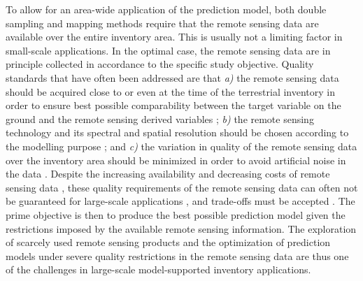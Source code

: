 To allow for an area-wide application of the prediction model, both double sampling and mapping methods require that the remote sensing data are available over the entire inventory area. This is usually not a limiting factor in small-scale applications. In the optimal case, the remote sensing data are in principle collected in accordance to the specific study objective. Quality standards that have often been addressed are that \textit{a)} the remote sensing data should be acquired close to or even at the time of the terrestrial inventory in order to ensure best possible comparability between the target variable on the ground and the remote sensing derived variables \citep{mcroberts2015}; \textit{b)} the remote sensing technology and its spectral and spatial resolution should be chosen according to the modelling purpose \citep{kohl2006}; and \textit{c)} the variation in quality of the remote sensing data over the inventory area should be minimized in order to avoid artificial noise in the data \citep{naesset2014inmaltamo}. Despite the increasing availability and decreasing costs of remote sensing data \citep{white2016}, these quality requirements of the remote sensing data can often not be guaranteed for large-scale applications \citep{maack2016}, and trade-offs must be accepted \citep{jakubowski2013}. The prime objective is then to produce the best possible prediction model given the restrictions imposed by the available remote sensing information. The exploration of scarcely used remote sensing products and the optimization of prediction models under severe quality restrictions in the remote sensing data are thus one of the challenges in large-scale model-supported inventory applications.\par

